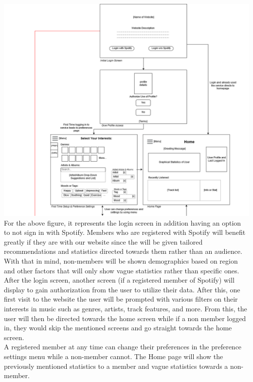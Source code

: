 \documentclass[letter, 11pt]{article}
\begin{document}
\includegraphics[scale=0.57,left]{storyboard_1.png}\\
For the above figure, it represents the login screen in addition having an option to not sign in with Spotify. Members who are registered with Spotify will benefit greatly if they are with our website since the will be given tailored recommendations and statistics directed towards them rather than an audience. With that in mind, non-members will be shown demographics based on region and other factors that will only show vague statistics rather than specific ones.\\
After the login screen, another screen (if a registered member of Spotify) will display to gain authorization from the user to utilize their data. After this, one first visit to the website the user will be prompted with various filters on their interests in music such as genres, artists, track features, and more. From this, the user will then be directed towards the home screen while if a non member logged in, they would skip the mentioned screens and go straight towards the home screen.\\
A registered member at any time can change their preferences in the preference settings menu while a non-member cannot. The Home page will show the previously mentioned statistics to a member and vague statistics towards a non-member.\\
\end{document}
